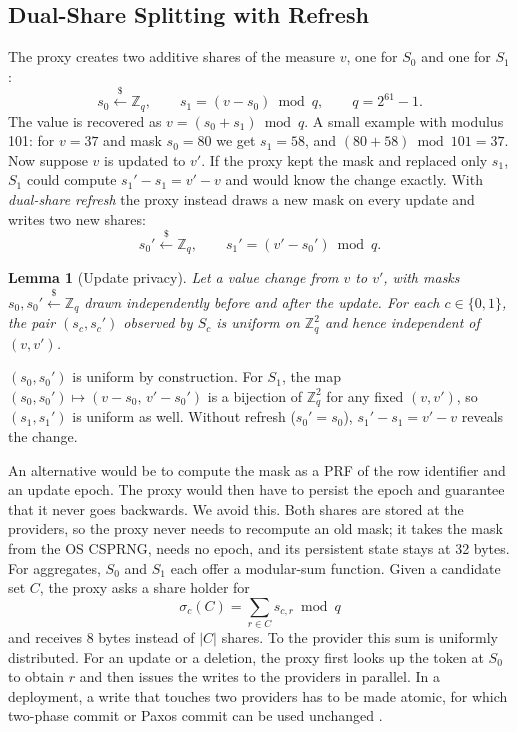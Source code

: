 \documentclass[conference]{IEEEtran}
\newtheorem{lemma}{Lemma}
\begin{document}
\subsection{Dual-Share Splitting with Refresh}\label{sec:c2}
The proxy creates two additive shares of the measure $v$, one for $S_0$ and one for $S_1$:
\begin{equation}
  s_0\xleftarrow{\$}\mathbb{Z}_q,\qquad s_1=(v-s_0)\bmod q,\qquad q=2^{61}-1.
  \label{eq:split}
\end{equation}
The value is recovered as $v=(s_0+s_1)\bmod q$. A small example with modulus 101: for $v=37$ and mask $s_0=80$ we get $s_1=58$, and $(80+58)\bmod 101=37$. Now suppose $v$ is updated to $v'$. If the proxy kept the mask and replaced only $s_1$, $S_1$ could compute $s_1'-s_1=v'-v$ and would know the change exactly. With \emph{dual-share refresh} the proxy instead draws a new mask on every update and writes two new shares:
\begin{equation}
  s_0'\xleftarrow{\$}\mathbb{Z}_q,\qquad s_1'=(v'-s_0')\bmod q.
  \label{eq:refresh}
\end{equation}
\begin{lemma}[Update privacy]
Let a value change from $v$ to $v'$, with masks $s_0,s_0'\xleftarrow{\$}\mathbb{Z}_q$ drawn independently before and after the update. For each $c\in\{0,1\}$, the pair $(s_c,s_c')$ observed by $S_c$ is uniform on $\mathbb{Z}_q^2$ and hence independent of $(v,v')$.
\end{lemma}
\begin{IEEEproof}
$(s_0,s_0')$ is uniform by construction. For $S_1$, the map $(s_0,s_0')\mapsto(v-s_0,\,v'-s_0')$ is a bijection of $\mathbb{Z}_q^2$ for any fixed $(v,v')$, so $(s_1,s_1')$ is uniform as well. Without refresh ($s_0'=s_0$), $s_1'-s_1=v'-v$ reveals the change.
\end{IEEEproof}
An alternative would be to compute the mask as a PRF of the row identifier and an update epoch. The proxy would then have to persist the epoch and guarantee that it never goes backwards. We avoid this. Both shares are stored at the providers, so the proxy never needs to recompute an old mask; it takes the mask from the OS CSPRNG, needs no epoch, and its persistent state stays at 32 bytes. For aggregates, $S_0$ and $S_1$ each offer a modular-sum function. Given a candidate set $C$, the proxy asks a share holder for
\begin{equation}
  \sigma_c(C)=\sum_{r\in C} s_{c,r} \bmod q
  \label{eq:agg}
\end{equation}
and receives 8 bytes instead of $|C|$ shares. To the provider this sum is uniformly distributed. For an update or a deletion, the proxy first looks up the token at $S_0$ to obtain $r$ and then issues the writes to the providers in parallel. In a deployment, a write that touches two providers has to be made atomic, for which two-phase commit or Paxos commit can be used unchanged \cite{gray2006consensus}.
\end{document}
